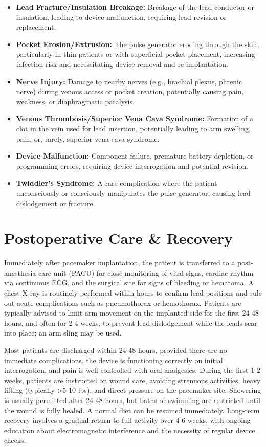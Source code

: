 \begin{itemize}
\begin{itemize}
      \item \textbf{Lead Fracture/Insulation Breakage:} Breakage of the lead conductor or insulation, leading to device malfunction, requiring lead revision or replacement.
      \item \textbf{Pocket Erosion/Extrusion:} The pulse generator eroding through the skin, particularly in thin patients or with superficial pocket placement, increasing infection risk and necessitating device removal and re-implantation.
      \item \textbf{Nerve Injury:} Damage to nearby nerves (e.g., brachial plexus, phrenic nerve) during venous access or pocket creation, potentially causing pain, weakness, or diaphragmatic paralysis.
      \item \textbf{Venous Thrombosis/Superior Vena Cava Syndrome:} Formation of a clot in the vein used for lead insertion, potentially leading to arm swelling, pain, or, rarely, superior vena cava syndrome.
      \item \textbf{Device Malfunction:} Component failure, premature battery depletion, or programming errors, requiring device interrogation and potential revision.
      \item \textbf{Twiddler's Syndrome:} A rare complication where the patient unconsciously or consciously manipulates the pulse generator, causing lead dislodgement or fracture.
    \end{itemize}
\end{itemize}

\section*{Postoperative Care \& Recovery}
Immediately after pacemaker implantation, the patient is transferred to a post-anesthesia care unit (PACU) for close monitoring of vital signs, cardiac rhythm via continuous ECG, and the surgical site for signs of bleeding or hematoma. A chest X-ray is routinely performed within hours to confirm lead positions and rule out acute complications such as pneumothorax or hemothorax. Patients are typically advised to limit arm movement on the implanted side for the first 24-48 hours, and often for 2-4 weeks, to prevent lead dislodgement while the leads scar into place; an arm sling may be used.

Most patients are discharged within 24-48 hours, provided there are no immediate complications, the device is functioning correctly on initial interrogation, and pain is well-controlled with oral analgesics. During the first 1-2 weeks, patients are instructed on wound care, avoiding strenuous activities, heavy lifting (typically >5-10 lbs), and direct pressure on the pacemaker site. Showering is usually permitted after 24-48 hours, but baths or swimming are restricted until the wound is fully healed. A normal diet can be resumed immediately. Long-term recovery involves a gradual return to full activity over 4-6 weeks, with ongoing education about electromagnetic interference and the necessity of regular device checks.

